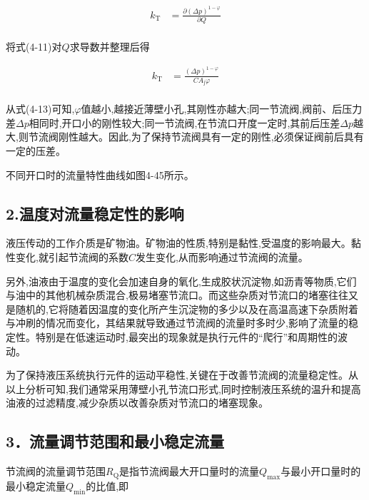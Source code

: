 \begin{equation}
\begin{split}
k_\text{T} & =\frac{\partial(\Delta p)^{1-\varphi}}{\partial Q}\\ 
\end{split}
\end{equation}

将式(4-11)对$Q$求导数并整理后得

\begin{equation}
\begin{split}
k_\text{T} & =\frac{(\Delta p)^{1-\varphi}}{CA_\text{j}\varphi}\\ 
\end{split}
\end{equation}

从式(4-13)可知,$\varphi$值越小,越接近薄壁小孔,其刚性亦越大;同一节流阀,阀前、后压力差$\Delta p$相同时,开口小的刚性较大;同一节流阀,在节流口开度一定时,其前后压差$\Delta p$越大,则节流阀刚性越大。因此,为了保持节流阀具有一定的刚性,必须保证阀前后具有一定的压差。

不同开口时的流量特性曲线如图4-45所示。

\subsection*{2.温度对流量稳定性的影响}

液压传动的工作介质是矿物油。矿物油的性质,特别是黏性,受温度的影响最大。黏性变化,就引起节流阀的系数$C$发生变化,从而影响通过节流阀的流量。

另外,油液由于温度的变化会加速自身的氧化,生成胶状沉淀物,如沥青等物质,它们与油中的其他机械杂质混合,极易堵塞节流口。而这些杂质对节流口的堵塞往往又是随机的,它将随着因温度的变化所产生沉淀物的多少以及在高温高速下杂质附着与冲刷的情况而变化，其结果就导致通过节流阀的流量时多时少,影响了流量的稳定性。特别是在低速运动时,最突出的现象就是执行元件的“爬行”和周期性的波动。

为了保持液压系统执行元件的运动平稳性,关键在于改善节流阀的流量稳定性。从以上分析可知,我们通常采用薄壁小孔节流口形式,同时控制液压系统的温升和提高油液的过滤精度,减少杂质以改善杂质对节流口的堵塞现象。

\subsection*{3．流量调节范围和最小稳定流量}

节流阀的流量调节范围$R_\text{Q}$是指节流阀最大开口量时的流量$Q_\text{max}$与最小开口量时的最小稳定流量$Q_\text{min}$的比值,即

